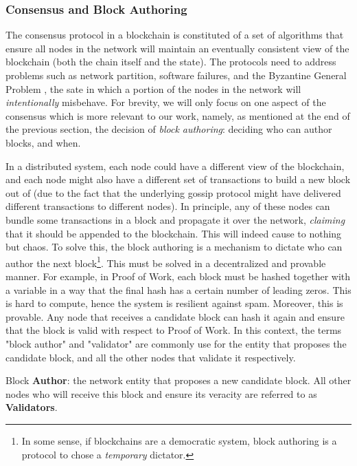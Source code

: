 \subsubsection{Consensus and Block Authoring} \label{chap_bg:subsec:consensus_authorship}

The consensus protocol in a blockchain is constituted of a set of algorithms that ensure all nodes
in the network will maintain an eventually consistent view of the blockchain (both the chain itself
and the state). The protocols need to address problems such as network partition, software failures,
and the Byzantine General Problem \cite{Lamport_Shostak_Pease_1982}, the sate in which a portion of
the nodes in the network will \textit{intentionally} misbehave. For brevity, we will only focus on
one aspect of the consensus which is more relevant to our work, namely, as mentioned at the end of
the previous section, the decision of \textit{block authoring}: deciding who can author blocks, and
when.

In a distributed system, each node could have a different view of the blockchain, and each node
might also have a different set of transactions to build a new block out of (due to the fact that
the underlying gossip protocol might have delivered different transactions to different nodes). In
principle, any of these nodes can bundle some transactions in a block and propagate it over the
network, \textit{claiming} that it should be appended to the blockchain. This will indeed cause to
nothing but chaos. To solve this, the block authoring is a mechanism to dictate who can author the
next block\footnote{In some sense, if blockchains are a democratic system, block authoring is a
protocol to chose a \textit{temporary} dictator.}. This must be solved in a decentralized and
provable manner. For example, in Proof of Work, each block must be hashed together with a variable
in a way that the final hash has a certain number of leading zeros. This is hard to compute, hence
the system is resilient against spam. Moreover, this is provable. Any node that receives a candidate
block can hash it again and ensure that the block is valid with respect to Proof of Work. In this
context, the terms "block author" and "validator" are commonly use for the entity that proposes the
candidate block, and all the other nodes that validate it respectively.

\begin{definition} \label{def:auhtor_validator}
	Block \textbf{Author}: the network entity that proposes a new candidate block. All other nodes who will
	receive this block and ensure its veracity are referred to as \textbf{Validators}.
\end{definition}

